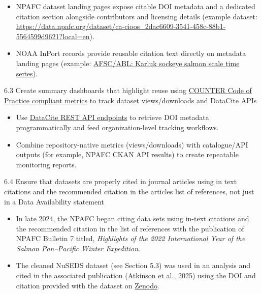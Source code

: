 \documentclass[
  letterpaper,
  DIV=11,
  numbers=noendperiod]{scrartcl}
\providecommand{\tightlist}{%
  \setlength{\itemsep}{0pt}\setlength{\parskip}{0pt}}
\begin{document}
\begin{itemize}
\tightlist
\item
  NPAFC dataset landing pages expose citable DOI metadata and a
  dedicated citation section alongside contributors and licensing
  details (example dataset:
  \url{https://data.npafc.org/dataset/ca-cioos_2dac6609-3541-458c-88b1-5564599d9621?local=en}).
\item
  NOAA InPort records provide reusable citation text directly on
  metadata landing pages (example:
  \href{https://www.fisheries.noaa.gov/inport/item/17247}{AFSC/ABL:
  Karluk sockeye salmon scale time series}).
\end{itemize}

6.3 Create summary dashboards that highlight reuse using
\href{https://www.countermetrics.org/}{COUNTER Code of Practice
compliant metrics} to track dataset views/downloads and DataCite APIs

\begin{itemize}
\tightlist
\item
  Use \href{https://support.datacite.org/docs/api}{DataCite REST API
  endpoints} to retrieve DOI metadata programmatically and feed
  organization-level tracking workflows.
\item
  Combine repository-native metrics (views/downloads) with catalogue/API
  outputs (for example, NPAFC CKAN API results) to create repeatable
  monitoring reports.
\end{itemize}

6.4 Ensure that datasets are properly cited in journal articles using in
text citations and the recommended citation in the articles list of
references, not just in a Data Availability statement

\begin{itemize}
\tightlist
\item
  In late 2024, the NPAFC began citing data sets using in-text citations
  and the recommended citation in the list of references with the
  publication of NPAFC Bulletin 7 titled, \emph{Highlights of the 2022
  International Year of the Salmon Pan--Pacific Winter Expedition}.
\item
  The cleaned NuSEDS dataset (see Section 5.3) was used in an analysis
  and cited in the associated publication
  (\href{https://doi.org/10.1139/cjfas-2024-0387}{Atkinson et al.,
  2025}) using the DOI and citation provided with the dataset on
  \href{https://doi.org/10.5281/zenodo.15625993}{Zenodo}.
\end{itemize}
\end{document}
